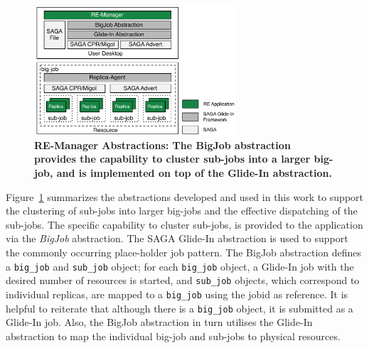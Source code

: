 \documentclass{rspublic}
\begin{document}
\begin{figure}[t]
    \begin{center}  
      \includegraphics[width=0.67\textwidth]{remdmanager_v12}
      \caption{\footnotesize \bf RE-Manager Abstractions: The BigJob
          abstraction provides the capability to cluster sub-jobs into a
          larger big-job, and is implemented on top of the Glide-In
          abstraction.\vspace*{-3em}}
     \label{fig:abstractions} 
    \end{center}
\end{figure}

Figure~\ref{fig:abstractions} summarizes the abstractions developed
and used in this work to support the clustering of sub-jobs into 
larger big-jobs and the effective dispatching of the sub-jobs.  The
specific capability to cluster sub-jobs, is provided to the
application via the \emph{BigJob} abstraction. 
The SAGA Glide-In abstraction is used to
support the commonly occurring place-holder job pattern.
The BigJob abstraction defines a \texttt{big\_job}
and \texttt{sub\_job} object; for each \texttt{big\_job}
object, a Glide-In job with the desired number of resources is
started, and \texttt{sub\_job} objects, which correspond to
individual replicas, are mapped to a \texttt{big\_job} using the jobid
as reference. It is helpful to reiterate that although there is a
\texttt{big\_job} object, it is submitted as a Glide-In job. Also, the
BigJob abstraction in turn utilises the Glide-In abstraction to map the
individual big-job and sub-jobs to physical resources.
\end{document}
